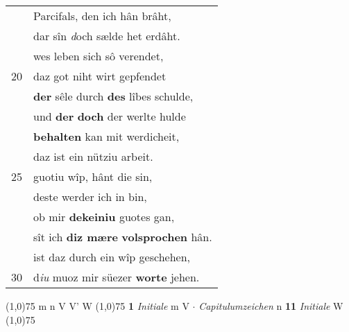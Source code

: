 \documentclass[8pt,a4paper,notitlepage]{article}
\begin{document}
\begin{table}[ht]
\begin{minipage}[t]{0.5\linewidth}
\begin{tabular}{rl}
 & Parcifals, den ich hân brâht,\\ 
 & dar sîn \textit{d}och sælde het erdâht.\\ 
 & wes leben sich sô verendet,\\ 
20 & daz got niht wirt gepfendet\\ 
 & \textbf{der} sêle durch \textbf{des} lîbes schulde,\\ 
 & und \textbf{der} \textbf{doch} der werlte hulde\\ 
 & \textbf{behalten} kan mit werdicheit,\\ 
 & daz ist ein nütziu arbeit.\\ 
25 & guotiu wîp, hânt die sin,\\ 
 & deste werder ich in bin,\\ 
 & ob mir \textbf{dekeiniu} guotes gan,\\ 
 & sît ich \textbf{diz mære} \textbf{volsprochen} hân.\\ 
 & ist daz durch ein wîp geschehen,\\ 
30 & d\textit{iu} muoz mir süezer \textbf{worte} jehen.\\ 
\end{tabular}
\scriptsize
\line(1,0){75} \newline
m n V V' W \newline
\line(1,0){75} \newline
\textbf{1} \textit{Initiale} m V   $\cdot$ \textit{Capitulumzeichen} n  \textbf{11} \textit{Initiale} W  \newline
\line(1,0){75} \newline

\end{minipage}
\end{table}
\end{document}
